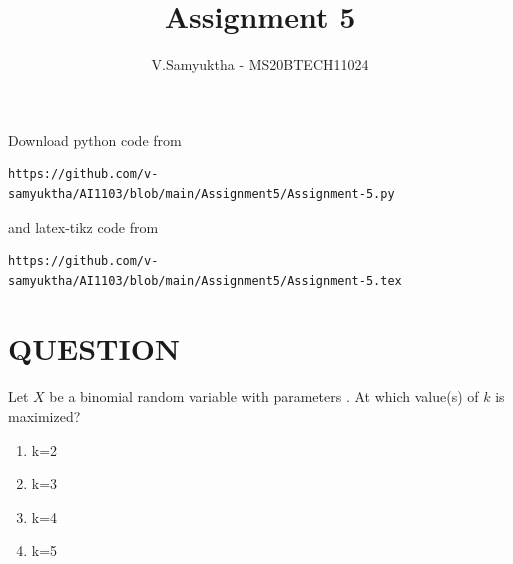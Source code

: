 \documentclass[journal,12pt,twocolumn]{IEEEtran}
\begin{document}
     \def\rightbox#1{\makebox[0in][r]{#1}}
     \def\centbox#1{\makebox[0in]{#1}}
     \def\topbox#1{\raisebox{-\baselineskip}[0in][0in]{#1}}
     \def\midbox#1{\raisebox{-0.5\baselineskip}[0in][0in]{#1}}
\vspace{3cm}
\title{Assignment 5}
\author{V.Samyuktha - MS20BTECH11024}
\maketitle
\newpage
\bigskip
\renewcommand{\thefigure}{\theenumi}
\renewcommand{\thetable}{\theenumi}
Download python code from 
\begin{lstlisting}
https://github.com/v-samyuktha/AI1103/blob/main/Assignment5/Assignment-5.py
\end{lstlisting}
%
and latex-tikz code from 
%
\begin{lstlisting}
https://github.com/v-samyuktha/AI1103/blob/main/Assignment5/Assignment-5.tex
\end{lstlisting}
\section{\textbf{QUESTION}}
Let $X$ be a binomial random variable with parameters . At which value(s) of $k$ is  maximized?\\
\begin{enumerate}
\item k=2 
\item k=3 
\item k=4 
\item k=5
\end{enumerate}
\end{document}

